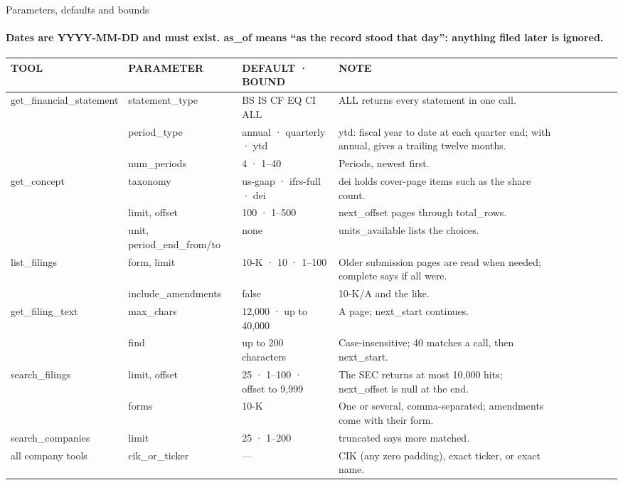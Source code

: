 \documentclass[aspectratio=169,10pt]{beamer}
\newcommand{\kicker}{}
\newcommand{\stcode}{}\newcommand{\stcheck}{}
\newcommand{\status}[2]{\renewcommand{\stcode}{#1}\renewcommand{\stcheck}{#2}}
\newcommand{\cd}[1]{{\ttfamily\fontsize{4.6}{6.15}\selectfont #1}}
\newcommand{\thead}[1]{{\ttfamily\color{muted}\fontsize{5}{6}\selectfont #1}}
\newcommand{\tstart}{\hline\noalign{\vspace{0.8mm}}}
\newcommand{\tmid}{\\[0.4mm]\hline\noalign{\vspace{0.8mm}}}
\newcommand{\tend}{\\[0.4mm]\hline}
\newenvironment{tbl}[1][5.4]{\centering\fontsize{#1}{\numexpr0\relax}\selectfont\fontsize{#1}{1.27\dimexpr#1pt\relax}\selectfont
  \renewcommand{\arraystretch}{1.08}\setlength{\tabcolsep}{1.6mm}}{\par}
\begin{document}
\renewcommand{\kicker}{10 · parameters and bounds · table}
\status{\cd{\_bounded(name, value, low, high)} and \cd{iso\_date} at the top of each tool; out of range is INVALID\_INPUT, never silently clipped.}{\cd{test\_cases.py} tries the edge of each bound.}
\begin{frame}{Parameters, defaults and bounds}
\framesubtitle{Dates are YYYY-MM-DD and must exist. \cd{as\_of} means ``as the record stood that day'': anything filed later is ignored.}
\begin{tbl}[5.2]
\begin{tabular}{@{}C{29mm}C{26mm}P{24mm}P{59mm}@{}}
\tstart
\thead{TOOL} & \thead{PARAMETER} & \thead{DEFAULT · BOUND} & \thead{NOTE} \tmid
get\_financial\_statement & statement\_type & BS IS CF EQ CI ALL & ALL returns every statement in one call. \\
 & period\_type & annual · quarterly · ytd & ytd: fiscal year to date at each quarter end; with annual, gives a trailing twelve months. \\
 & num\_periods & 4 · 1--40 & Periods, newest first. \tmid
get\_concept & taxonomy & us-gaap · ifrs-full · dei & dei holds cover-page items such as the share count. \\
 & limit, offset & 100 · 1--500 & \cd{next\_offset} pages through \cd{total\_rows}. \\
 & unit, period\_end\_from/to & none & \cd{units\_available} lists the choices. \tmid
list\_filings & form, limit & 10-K · 10 · 1--100 & Older submission pages are read when needed; \cd{complete} says if all were. \\
 & include\_amendments & false & 10-K/A and the like. \tmid
get\_filing\_text & max\_chars & 12,000 · up to 40,000 & A page; \cd{next\_start} continues. \\
 & find & up to 200 characters & Case-insensitive; 40 matches a call, then \cd{next\_start}. \tmid
search\_filings & limit, offset & 25 · 1--100 · offset to 9,999 & The SEC returns at most 10,000 hits; \cd{next\_offset} is null at the end. \\
 & forms & 10-K & One or several, comma-separated; amendments come with their form. \tmid
search\_companies & limit & 25 · 1--200 & \cd{truncated} says more matched. \tmid
\textsf{all company tools} & cik\_or\_ticker & --- & CIK (any zero padding), exact ticker, or exact name. \tend
\end{tabular}
\end{tbl}
\end{frame}
\end{document}
